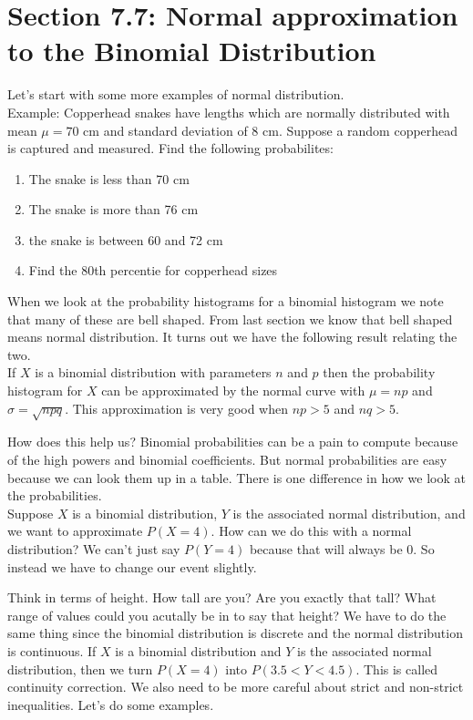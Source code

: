 \documentclass[14,fleqn]{article}
\begin{document}
\section{Section 7.7: Normal approximation to the Binomial Distribution}

Let's start with some more examples of normal distribution.\\
Example: Copperhead snakes have lengths which are normally distributed with mean $\mu=70$ cm and standard deviation of $8$ cm. Suppose a random copperhead is captured and measured. Find the following probabilites:
\begin{enumerate}
	\item The snake is less than 70 cm
	\item The snake is more than 76 cm
	\item the snake is between 60 and 72 cm
	\item Find the 80th percentie for copperhead sizes
\end{enumerate}

When we look at the probability histograms for a binomial histogram we note that many of these are bell shaped. From last section we know that bell shaped means normal distribution. It turns out we have the following result relating the two.\\

If $X$ is a binomial distribution with parameters $n$ and $p$ then the probability histogram for $X$ can be approximated by the normal curve with $\mu=np$ and $\sigma=\sqrt{npq}.$ This approximation is very good when $np>5$ and $nq>5.$

How does this help us? Binomial probabilities can be a pain to compute because of the high powers and binomial coefficients. But normal probabilities are easy because we can look them up in a table. There is one difference in how we look at the probabilities.\\

Suppose $X$ is a binomial distribution, $Y$ is the associated normal distribution, and we want to approximate $P(X=4).$ How can we do this with a normal distribution? We can't just say $P(Y=4)$ because that will always be 0. So instead we have to change our event slightly. 

Think in terms of height. How tall are you? Are you exactly that tall? What range of values could you acutally be in to say that height? We have to do the same thing since the binomial distribution is discrete and the normal distribution is continuous. If $X$ is a binomial distribution and $Y$ is the associated normal distribution, then we turn $P(X=4)$ into $P(3.5<Y<4.5).$ This is called continuity correction. We also need to be more careful about strict and non-strict inequalities. Let's do some examples.
\end{document}
